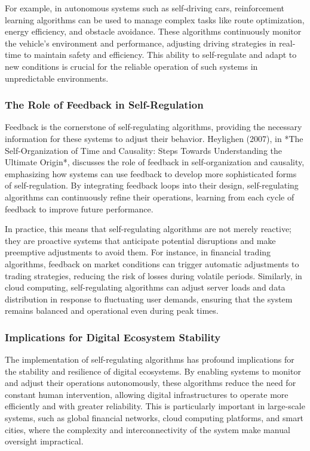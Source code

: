 \documentclass[12pt,twoside]{article}
\begin{document}
For example, in autonomous systems such as self-driving cars, reinforcement learning algorithms can be used to manage complex tasks like route optimization, energy efficiency, and obstacle avoidance. These algorithms continuously monitor the vehicle’s environment and performance, adjusting driving strategies in real-time to maintain safety and efficiency. This ability to self-regulate and adapt to new conditions is crucial for the reliable operation of such systems in unpredictable environments.

\subsubsection{The Role of Feedback in Self-Regulation}

Feedback is the cornerstone of self-regulating algorithms, providing the necessary information for these systems to adjust their behavior. Heylighen (2007), in *The Self-Organization of Time and Causality: Steps Towards Understanding the Ultimate Origin*, discusses the role of feedback in self-organization and causality, emphasizing how systems can use feedback to develop more sophisticated forms of self-regulation. By integrating feedback loops into their design, self-regulating algorithms can continuously refine their operations, learning from each cycle of feedback to improve future performance.

In practice, this means that self-regulating algorithms are not merely reactive; they are proactive systems that anticipate potential disruptions and make preemptive adjustments to avoid them. For instance, in financial trading algorithms, feedback on market conditions can trigger automatic adjustments to trading strategies, reducing the risk of losses during volatile periods. Similarly, in cloud computing, self-regulating algorithms can adjust server loads and data distribution in response to fluctuating user demands, ensuring that the system remains balanced and operational even during peak times.

\subsubsection{Implications for Digital Ecosystem Stability}

The implementation of self-regulating algorithms has profound implications for the stability and resilience of digital ecosystems. By enabling systems to monitor and adjust their operations autonomously, these algorithms reduce the need for constant human intervention, allowing digital infrastructures to operate more efficiently and with greater reliability. This is particularly important in large-scale systems, such as global financial networks, cloud computing platforms, and smart cities, where the complexity and interconnectivity of the system make manual oversight impractical.
\end{document}
